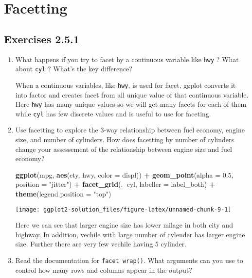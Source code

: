 \documentclass[]{book}
\newenvironment{Shaded}{\begin{snugshade}}{\end{snugshade}}
\newcommand{\KeywordTok}[1]{\textcolor[rgb]{0.13,0.29,0.53}{\textbf{#1}}}
\newcommand{\DataTypeTok}[1]{\textcolor[rgb]{0.13,0.29,0.53}{#1}}
\newcommand{\FloatTok}[1]{\textcolor[rgb]{0.00,0.00,0.81}{#1}}
\newcommand{\StringTok}[1]{\textcolor[rgb]{0.31,0.60,0.02}{#1}}
\newcommand{\OperatorTok}[1]{\textcolor[rgb]{0.81,0.36,0.00}{\textbf{#1}}}
\newcommand{\NormalTok}[1]{#1}
\begin{document}
\section{Facetting}\label{facetting}

\subsection{Exercises 2.5.1}\label{exercises-2.5.1}

\begin{enumerate}
\def\labelenumi{\arabic{enumi}.}
\item
  What happens if you try to facet by a continuous variable like
  \texttt{hwy} ? What about \texttt{cyl} ? What's the key difference?

  When a continuous variables, like \texttt{hwy}, is used for facet,
  ggplot converts it into factor and creates facet from all unique value
  of that continuous variable. Here \texttt{hwy} has many unique values
  so we will get many facets for each of them while \texttt{cyl} has few
  discrete values and is useful to use for faceting.
\item
  Use facetting to explore the 3-way relationship between fuel economy,
  engine size, and number of cylinders. How does facetting by number of
  cylinders change your assessement of the relationship between engine
  size and fuel economy?

\begin{Shaded}
\begin{Highlighting}[]
\KeywordTok{ggplot}\NormalTok{(mpg, }\KeywordTok{aes}\NormalTok{(cty, hwy, }\DataTypeTok{color =}\NormalTok{ displ)) }\OperatorTok{+}\StringTok{ }
\StringTok{  }\KeywordTok{geom_point}\NormalTok{(}\DataTypeTok{alpha =} \FloatTok{0.5}\NormalTok{, }\DataTypeTok{position =} \StringTok{"jitter"}\NormalTok{) }\OperatorTok{+}
\StringTok{  }\KeywordTok{facet_grid}\NormalTok{(.}\OperatorTok{~}\NormalTok{cyl, }\DataTypeTok{labeller =}\NormalTok{ label_both) }\OperatorTok{+}
\StringTok{  }\KeywordTok{theme}\NormalTok{(}\DataTypeTok{legend.position =} \StringTok{"top"}\NormalTok{)}
\end{Highlighting}
\end{Shaded}

  \texttt{[image: ggplot2-solution\_files/figure-latex/unnamed-chunk-9-1]}

  Here we can see that larger engine size has lower milage in both city
  and highway. In addition, vechile with large number of cylender has
  larger engine size. Further there are very few vechile having 5
  cylinder.
\item
  Read the documentation for \texttt{facet\ wrap()}. What arguments can
  you use to control how many rows and columns appear in the output?


\end{enumerate}
\end{document}
